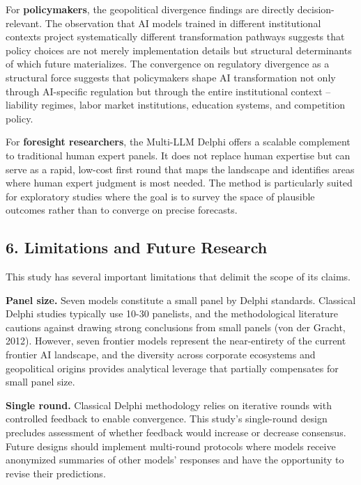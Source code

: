 \documentclass{article}
\begin{document}
For \textbf{policymakers}, the geopolitical divergence findings are directly decision-relevant. The observation that AI models trained in different institutional contexts project systematically different transformation pathways suggests that policy choices are not merely implementation details but structural determinants of which future materializes. The convergence on regulatory divergence as a structural force suggests that policymakers shape AI transformation not only through AI-specific regulation but through the entire institutional context -- liability regimes, labor market institutions, education systems, and competition policy.

For \textbf{foresight researchers}, the Multi-LLM Delphi offers a scalable complement to traditional human expert panels. It does not replace human expertise but can serve as a rapid, low-cost first round that maps the landscape and identifies areas where human expert judgment is most needed. The method is particularly suited for exploratory studies where the goal is to survey the space of plausible outcomes rather than to converge on precise forecasts.



\subsection{6. Limitations and Future Research}
\label{sec:6_limitations_and_future_research}

This study has several important limitations that delimit the scope of its claims.

\textbf{Panel size.} Seven models constitute a small panel by Delphi standards. Classical Delphi studies typically use 10-30 panelists, and the methodological literature cautions against drawing strong conclusions from small panels (von der Gracht, 2012). However, seven frontier models represent the near-entirety of the current frontier AI landscape, and the diversity across corporate ecosystems and geopolitical origins provides analytical leverage that partially compensates for small panel size.

\textbf{Single round.} Classical Delphi methodology relies on iterative rounds with controlled feedback to enable convergence. This study's single-round design precludes assessment of whether feedback would increase or decrease consensus. Future designs should implement multi-round protocols where models receive anonymized summaries of other models' responses and have the opportunity to revise their predictions.
\end{document}
